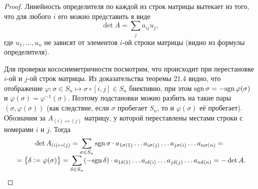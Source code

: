\begin{proof}
    Линейность определителя по каждой из строк матрицы вытекает из того, что для любого $i$ его можно представить в виде
    $$
    \det A = \sum_ja_{ij}u_j,
    $$
    где $u_1, \ldots, u_n$ не зависят от элементов $i$-ой строки матрицы (видно из формулы определителя). 

    Для проверки кососимметричности посмотрим, что происходит при перестановке $i$-ой и $j$-ой строк матрицы. Из доказательства теоремы 21.4 видно, что отображение $\varphi: \sigma \in S_n \mapsto \sigma\circ[i, j] \in S_n$ биективно, при этом $\mathrm{sgn}\,\sigma = -\mathrm{sgn}\,\varphi(\sigma)$ и $\varphi(\sigma) = \varphi^{-1}(\sigma)$. Поэтому подстановки можно разбить на такие пары $(\sigma, \varphi(\sigma))$ (как следствие, если $\sigma$ пробегает $S_n$, то и $\varphi(\sigma)$ её пробегает). Обозначим за $A_{(i) \leftrightarrow (j)}$ матрицу, у которой переставлены местами строки с номерами $i$ и $j$. Тогда
    $$
    \begin{array}{c}\displaystyle
        \det A_{(i) \leftrightarrow (j)} = \sum_{\sigma \in S_n}\mathrm{sgn}\,\sigma \cdot a_{1\sigma(1)}\ldots a_{i\sigma(j)}\ldots a_{j\sigma(i)} \ldots a_{n\sigma(n)} = {}\\\displaystyle{} = \big\{\delta \vcentcolon= \varphi(\sigma)\big\} = \sum_{\delta \in S_n}(-\mathrm{sgn}\,\delta)\cdot a_{1\delta(1)}\ldots a_{i\delta(i)}\ldots a_{j\delta(j)} \ldots a_{n\delta(n)} = -\det A.
    \end{array}
    $$
\end{proof}


